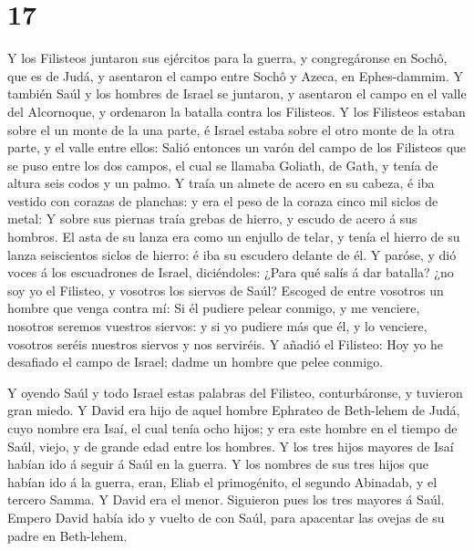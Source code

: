 \hypertarget{section-16}{%
\section{17}\label{section-16}}

 Y los Filisteos juntaron sus ejércitos para la guerra, y
congregáronse en Sochô, que es de Judá, y asentaron el campo entre Sochô
y Azeca, en Ephes-dammim.  Y también Saúl y los hombres de
Israel se juntaron, y asentaron el campo en el valle del Alcornoque, y
ordenaron la batalla contra los Filisteos.  Y los Filisteos
estaban sobre el un monte de la una parte, é Israel estaba sobre el otro
monte de la otra parte, y el valle entre ellos:  Salió
entonces un varón del campo de los Filisteos que se puso entre los dos
campos, el cual se llamaba Goliath, de Gath, y tenía de altura seis
codos y un palmo.  Y traía un almete de acero en su cabeza,
é iba vestido con corazas de planchas: y era el peso de la coraza cinco
mil siclos de metal:  Y sobre sus piernas traía grebas de
hierro, y escudo de acero á sus hombros.  El asta de su
lanza era como un enjullo de telar, y tenía el hierro de su lanza
seiscientos siclos de hierro: é iba su escudero delante de él.
 Y paróse, y dió voces á los escuadrones de Israel,
diciéndoles: ¿Para qué salís á dar batalla? ¿no soy yo el Filisteo, y
vosotros los siervos de Saúl? Escoged de entre vosotros un hombre que
venga contra mí:  Si él pudiere pelear conmigo, y me
venciere, nosotros seremos vuestros siervos: y si yo pudiere más que él,
y lo venciere, vosotros seréis nuestros siervos y nos serviréis.
 Y añadió el Filisteo: Hoy yo he desafiado el campo de
Israel; dadme un hombre que pelee conmigo.

 Y oyendo Saúl y todo Israel estas palabras del Filisteo,
conturbáronse, y tuvieron gran miedo.  Y David era hijo de
aquel hombre Ephrateo de Beth-lehem de Judá, cuyo nombre era Isaí, el
cual tenía ocho hijos; y era este hombre en el tiempo de Saúl, viejo, y
de grande edad entre los hombres.  Y los tres hijos mayores
de Isaí habían ido á seguir á Saúl en la guerra. Y los nombres de sus
tres hijos que habían ido á la guerra, eran, Eliab el primogénito, el
segundo Abinadab, y el tercero Samma.  Y David era el
menor. Siguieron pues los tres mayores á Saúl.  Empero
David había ido y vuelto de con Saúl, para apacentar las ovejas de su
padre en Beth-lehem.

